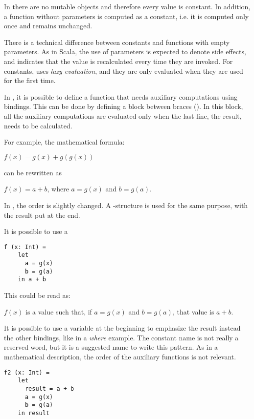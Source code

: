 In \Soda there are no mutable objects and therefore every value is constant.
In addition, a function without parameters is computed as a constant, i.e. it is computed only once and remains unchanged.

There is a technical difference between constants and functions with empty parameters.
As in Scala, the use of parameters is expected to denote side effects, and indicates that the value is recalculated every time they are invoked.
For constants, \Soda uses \textit{lazy evaluation}, and they are only evaluated when they are used for the first time.

In \Soda, it is possible to define a function that needs auxiliary computations using bindings.
This can be done by defining a block between braces (\srccode{\{ \}}).
In this block, all the auxiliary computations are evaluated only when the last line, the result, needs to be calculated.

For example, the mathematical formula:
\begin{center}
    $f(x) = g(x) + g(g(x))$
\end{center}
can be rewritten as
\begin{center}
    $f(x) = a + b$, where $a = g(x)$ and $b = g(a)$.
\end{center}

In \Soda, the order is slightly changed.
A \slet-\sdin structure is used for the same purpose, with the result put at the end.

It is possible to use a
\begin{lstlisting}[label={lst:exampleFunctionWithLetIn}]
  f (x: Int) =
    let
      a = g(x)
      b = g(a)
    in a + b
\end{lstlisting}

This could be read as:
\begin{center}
    $f(x)$ is a value such that, if $a = g(x)$ and $b = g(a)$, that value is $a + b$.
\end{center}

It is possible to use a variable at the beginning to emphasize the result instead the other bindings, like in a \textit{where} example.
The constant name  is not really a reserved word, but it is a suggested name to write this pattern.
As in a mathematical description, the order of the auxiliary functions is not relevant.

\begin{lstlisting}[label={lst:exampleFunctionLikeWhere}]
  f2 (x: Int) =
    let
      result = a + b
      a = g(x)
      b = g(a)
    in result
\end{lstlisting}


